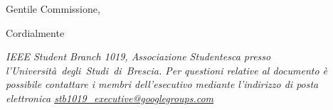 

\address{Università degli Studi di Brescia \\ Dipartimento di Ingegneria dell'Informazione \\ Via Branze, 38, Brescia (BS)}
\signature{
    Alessandro Depari, Councelor \\
    Jhon Doe, Chair \\
    \vspace{30mm}
}

\usepackage{blindtext}


    \begin{letter}{}
        
        \opening{Gentile Commissione,}


        \closing{Cordialmente}

        \begin{center}
            \itshape\footnotesize
            IEEE Student Branch 1019, Associazione Studentesca presso l'Università~degli~Studi~di~Brescia.
            Per questioni relative al documento è possibile contattare i membri dell'esecutivo mediante l'indirizzo di posta elettronica \href{mailto:stb1019\_executive@googlegroups.com}{stb1019\_executive@googlegroups.com}\/
        \end{center}
    \end{letter}

